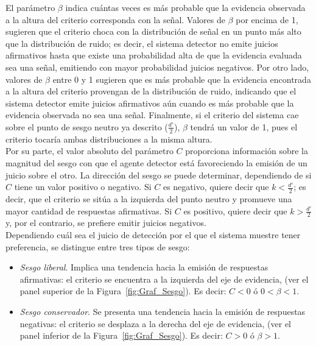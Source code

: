 \begin{itemize}
El parámetro $\beta$ indica cuántas veces es más probable que la evidencia observada a la altura del criterio corresponda con la señal. Valores de $\beta$ por encima de 1, sugieren que el criterio choca con la distribución de señal en un punto más alto que la distribución de ruido; es decir, el sistema detector no emite juicios afirmativos hasta que existe una probabilidad alta de que la evidencia evaluada sea una señal, emitiendo con mayor probabilidad juicios negativos. Por otro lado, valores de $\beta$ entre 0 y 1 sugieren que es más probable que la evidencia encontrada a la altura del criterio provengan de la distribución de ruido, indicando que el sistema detector emite juicios afirmativos aún cuando es más probable que la evidencia observada no sea una señal. Finalmente, si el criterio del sistema cae sobre el punto de sesgo neutro ya descrito ($\frac{d'}{2}$), $\beta$ tendrá un valor de 1, pues el criterio tocaría ambas distribuciones a la misma altura.\\

Por su parte, el valor absoluto del parámetro $C$ proporciona información sobre la magnitud del sesgo con que el agente detector está favoreciendo la emisión de un juicio sobre el otro. La dirección del sesgo se puede determinar, dependiendo de si $C$ tiene un valor positivo o negativo. Si $C$ es negativo, quiere decir que $k < \frac{d'}{2}$; es decir, que el criterio se sitúa a la izquierda del punto neutro y promueve una mayor cantidad de respuestas afirmativas. Si $C$ es positivo, quiere decir que $k > \frac{d'}{2}$ y, por el contrario, se prefiere emitir juicios negativos.\\

Dependiendo cuál sea el juicio de detección por el que el sistema muestre tener preferencia, se distingue entre tres tipos de sesgo:\\

\begin{itemize}
\item \textsl{Sesgo liberal}. Implica una tendencia hacia la emisión de respuestas afirmativas: el criterio se encuentra a la izquierda del eje de evidencia, (ver el panel superior de la Figura~\ref{fig:Graf_Sesgo}). Es decir: $C < 0$  ó  $0 < \beta < 1$.

\item \textsl{Sesgo conservador}. Se presenta una tendencia hacia la emisión de respuestas negativas: el criterio se desplaza a la derecha del eje de evidencia, (ver el panel inferior de la Figura~\ref{fig:Graf_Sesgo}). Es decir: $C > 0$  ó  $\beta > 1$.


\end{itemize}
\end{itemize}
